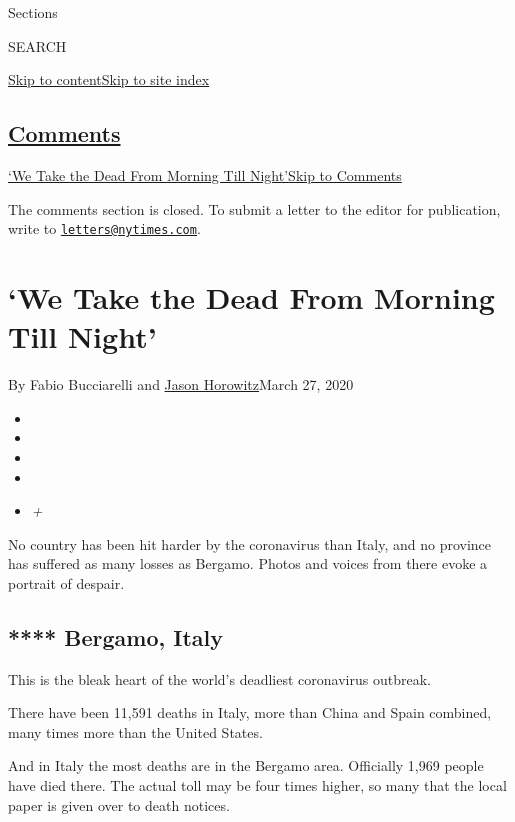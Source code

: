 Sections

SEARCH

\protect\hyperlink{site-content}{Skip to
content}\protect\hyperlink{site-index}{Skip to site index}

\hypertarget{comments}{%
\subsection{\texorpdfstring{\protect\hyperlink{commentsContainer}{Comments}}{Comments}}\label{comments}}

\href{}{`We Take the Dead From Morning Till Night'}\href{}{Skip to
Comments}

The comments section is closed. To submit a letter to the editor for
publication, write to
\href{mailto:letters@nytimes.com}{\nolinkurl{letters@nytimes.com}}.

\hypertarget{we-take-the-dead-from-morning-till-night}{%
\section{`We Take the Dead From Morning Till
Night'}\label{we-take-the-dead-from-morning-till-night}}

By Fabio Bucciarelli and
\href{https://www.nytimes.com/by/jason-horowitz}{Jason Horowitz}March
27, 2020

\begin{itemize}
\item
\item
\item
\item
\item
  \emph{+}
\end{itemize}

No country has been hit harder by the coronavirus than Italy, and no
province has suffered as many losses as Bergamo. Photos and voices from
there evoke a portrait of despair.

\hypertarget{-bergamo-italy}{%
\subsection{**** Bergamo, Italy}\label{-bergamo-italy}}

This is the bleak heart of the world's deadliest coronavirus outbreak.

There have been 11,591 deaths in Italy, more than China and Spain
combined, many times more than the United States.

And in Italy the most deaths are in the Bergamo area. Officially 1,969
people have died there. The actual toll may be four times higher, so
many that the local paper is given over to death notices.

